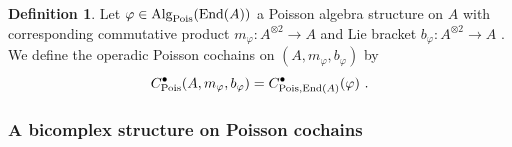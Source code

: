 \documentclass[11pt]{amsart}
\numberwithin{equation}{section}
\newtheorem{prop}[theo]{Proposition}
\theoremstyle{definition}
\newtheorem{defn}[theo]{Definition}
\newcommand{\bb}{\mathbb}
\newcommand{\mc}{\mathcal}
\newcommand{\mf}{\mathfrak}
\DeclareMathOperator{\Hom}{Hom}
\DeclareMathOperator{\Vect}{Vect}
\newcommand{\K}{{\bb K}}
\newcommand{\ik}{{\bb K}}
\newcommand{\End}{{\textup{End}}}
\newcommand{\Ind}{{\textup{Ind}}}
\newcommand{\Alg}{{\textup{Alg}}}
\newcommand{\Pois}{{\textup{Pois}}}
\newcommand{\Comm}{{\textup{Comm}}}
\newcommand{\Lie}{{\textup{Lie}}}
\newcommand{\Op}{{\textup{Op}}}
\newcommand{\Ass}{{\textup{Ass}}}
\newcommand{\Ss}{{{\mf{S}}}}
\newcommand{\0}{{\textbf{0}}}
\def\IN{\mathbb{N}}
\def\PP{{\mc P}}
\def\QQ{{\mc Q}}
\def\gf{\mathfrak{g}}
\def \mf{\mathfrak}
\def \Op{\mathrm{Op}}
\def \ie{{\it i.e.}}
\newcommand{\tensor}[1]{\underset{#1}{\otimes}}
\begin{document}

\begin{defn} Let $\varphi \in \Alg_\Pois(\End(A))$ a Poisson algebra structure on $A$ with corresponding commutative product $m_\varphi:A^{\otimes 2} \to A$ and Lie bracket $b_\varphi:A^{\otimes 2} \to A$ . We define the operadic Poisson cochains on $(A,m_\varphi,b_\varphi)$ by
\[ C_\Pois^\bullet(A,m_\varphi,b_\varphi)=C_{\Pois,\End(A)}^\bullet(\varphi) \ . \]
\end{defn}

%

\subsubsection{A bicomplex structure on Poisson cochains}
\end{document}
